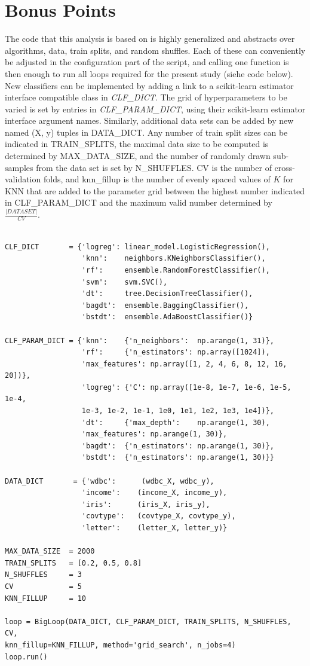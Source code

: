 \documentclass[twoside,11pt]{article}
\begin{document}
	\section{Bonus Points}
		The code that this analysis is based on is highly generalized and abstracts over algorithms, data, train splits, and random shuffles. Each of these can conveniently be adjusted in the configuration part of the script, and calling one function is then enough to run all loops required for the present study (siehe code below). New classifiers can be implemented by adding a link to a scikit-learn estimator interface compatible class in \textit{CLF\_DICT}. The grid of hyperparameters to be varied is set by entries in \textit{CLF\_PARAM\_DICT}, using their scikit-learn estimator interface argument names. Similarly, additional data sets can be added by new named (X, y) tuples in DATA\_DICT. Any number of train split sizes can be indicated in TRAIN\_SPLITS, the maximal data size to be computed is determined by MAX\_DATA\_SIZE, and the number of randomly drawn sub-samples from the data set is set by N\_SHUFFLES. CV is the number of cross-validation folds, and knn\_fillup is the number of evenly spaced values of $K$ for KNN that are added to the parameter grid between the highest number indicated in CLF\_PARAM\_DICT and the maximum valid number determined by $\frac{|DATASET|}{CV}$.
		
		\begin{verbatim}

CLF_DICT       = {'logreg': linear_model.LogisticRegression(),
                  'knn':    neighbors.KNeighborsClassifier(),
                  'rf':     ensemble.RandomForestClassifier(),
                  'svm':    svm.SVC(),
                  'dt':     tree.DecisionTreeClassifier(),
                  'bagdt':  ensemble.BaggingClassifier(),
                  'bstdt':  ensemble.AdaBoostClassifier()}
                  
CLF_PARAM_DICT = {'knn':    {'n_neighbors':  np.arange(1, 31)},
                  'rf':     {'n_estimators': np.array([1024]),
                  'max_features': np.array([1, 2, 4, 6, 8, 12, 16, 20])},
                  'logreg': {'C': np.array([1e-8, 1e-7, 1e-6, 1e-5, 1e-4,
                  1e-3, 1e-2, 1e-1, 1e0, 1e1, 1e2, 1e3, 1e4])},
                  'dt':     {'max_depth':    np.arange(1, 30),
                  'max_features': np.arange(1, 30)},
                  'bagdt':  {'n_estimators': np.arange(1, 30)},
                  'bstdt':  {'n_estimators': np.arange(1, 30)}}

DATA_DICT       = {'wdbc':      (wdbc_X, wdbc_y),
                  'income':    (income_X, income_y),
                  'iris':      (iris_X, iris_y),
                  'covtype':   (covtype_X, covtype_y),
                  'letter':    (letter_X, letter_y)}

MAX_DATA_SIZE  = 2000
TRAIN_SPLITS   = [0.2, 0.5, 0.8]
N_SHUFFLES     = 3
CV             = 5
KNN_FILLUP     = 10

loop = BigLoop(DATA_DICT, CLF_PARAM_DICT, TRAIN_SPLITS, N_SHUFFLES, CV,
knn_fillup=KNN_FILLUP, method='grid_search', n_jobs=4)
loop.run()
		\end{verbatim}
	
\end{document}

